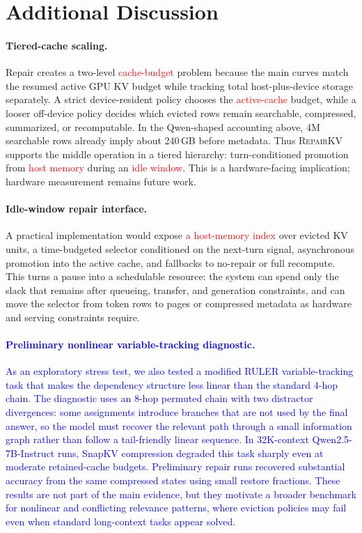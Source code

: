 \documentclass{article}
\newcommand{\repairkv}{\textsc{RepairKV}}
\begin{document}
\section{Additional Discussion}
\label{app:additional-discussion}

\paragraph{Tiered-cache scaling.}
Repair creates a two-level \textcolor{red}{cache-budget} problem because the main curves match
the resumed active GPU KV budget while tracking total host-plus-device
storage separately.
A strict device-resident policy chooses the \textcolor{red}{active-cache} budget, while a
looser off-device policy decides which evicted rows remain searchable,
compressed, summarized, or recomputable.
In the Qwen-shaped accounting
above, 4M searchable rows already imply about 240\,GB before metadata.
Thus \repairkv{} supports the middle operation in a tiered hierarchy:
turn-conditioned promotion from \textcolor{red}{host memory} during an \textcolor{red}{idle window}.
This is a hardware-facing implication; hardware measurement remains
future work.

\paragraph{Idle-window repair interface.}
A practical implementation would expose \textcolor{red}{a host-memory index} over evicted KV
units, a time-budgeted selector conditioned on the next-turn signal,
asynchronous promotion into the active cache, and fallbacks to no-repair or
full recompute.
This turns a pause into a schedulable resource: the system can spend only
the slack that remains after queueing, transfer, and generation
constraints, and can move the selector from token rows to pages or
compressed metadata as hardware and serving constraints require.

\paragraph{\textcolor{blue}{Preliminary nonlinear variable-tracking diagnostic.}}
\label{app:vt8hop-div2}
\textcolor{blue}{As an exploratory stress test, we also tested a modified RULER
variable-tracking task that makes the dependency structure less linear than the
standard 4-hop chain. The diagnostic uses an 8-hop permuted chain with two
distractor divergences: some assignments introduce branches that are not used by
the final answer, so the model must recover the relevant path through a small
information graph rather than follow a tail-friendly linear sequence. In
32K-context Qwen2.5-7B-Instruct runs, SnapKV compression degraded this task
sharply even at moderate retained-cache budgets. Preliminary repair runs
recovered substantial accuracy from the same compressed states using small
restore fractions. These results are not part of the main evidence, but they
motivate a broader benchmark for nonlinear and conflicting relevance patterns,
where eviction policies may fail even when standard long-context tasks appear
solved.}
\end{document}
